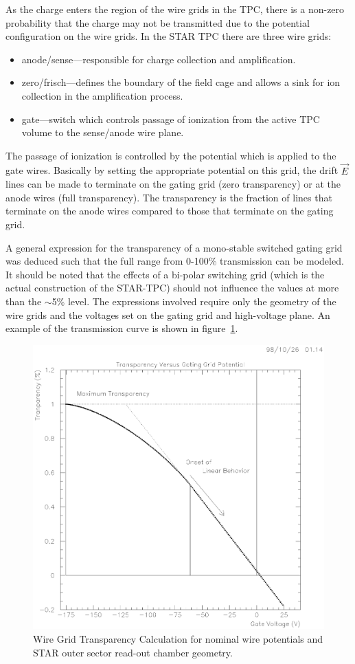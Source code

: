 \documentclass{article}
\begin{document}
As the charge enters the region of the wire grids in the
TPC, there is a non-zero probability that the charge may not
be transmitted due to the potential configuration on the wire
grids.  In the STAR TPC there are three wire grids:
\begin{itemize}
   \item anode/sense---responsible for charge collection and
     amplification.
   \item zero/frisch---defines the boundary of the field cage and
     allows a sink for ion collection in the amplification process.
   \item gate---switch which controls passage of ionization from
     the active TPC volume to the sense/anode wire plane.
\end{itemize}
The passage of ionization is controlled by the potential which
is applied to the gate wires.  Basically by setting the appropriate
potential on this grid, the drift $\vec{E}$ lines can be made to
terminate on the gating grid (zero transparency) or at the anode
wires (full transparency).  The transparency is the fraction of
lines that terminate on the anode wires compared to those that
terminate on the gating grid.

A general expression for the transparency of a mono-stable switched
gating grid was deduced such that
the full range from 0-100\% transmission can be
modeled.  It should be noted that the effects of a bi-polar switching
grid (which is the actual construction of the STAR-TPC) should not
influence the values at more than the $\sim$5\% level.
The expressions involved require only the geometry of the
wire grids and the voltages set on the gating grid
and high-voltage plane.  An example of the transmission curve
is shown in figure~\ref{fig:gridTransparency}.
\begin{figure}[htb]
\begin{center}
\includegraphics[bbllx=14pt,bblly=137pt,bburx=569pt,bbury=701pt,width=.55\textwidth]{./pics/gridTransparency.ps}
\caption{Wire Grid Transparency Calculation for nominal wire potentials
  and STAR outer sector read-out chamber geometry.}
\label{fig:gridTransparency}
\end{center}
\end{figure}
\end{document}
